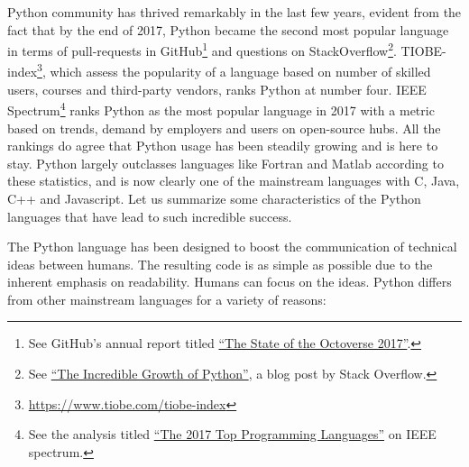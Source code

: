 Python community has thrived remarkably in the last few years, evident from the
fact that by the end of 2017, Python became the second most popular language in
terms of pull-requests in GitHub\footnote{See GitHub's annual report titled
\href{https://octoverse.github.com/}{ ``The State of the Octoverse 2017''}.} and
questions on StackOverflow\footnote{See
\href{https://stackoverflow.blog/2017/09/06/incredible-growth-python/}{ ``The
Incredible Growth of Python''}, a blog post by Stack Overflow.}.
%
TIOBE-index\footnote{\url{https://www.tiobe.com/tiobe-index}}, which assess the
popularity of a language based on number of skilled users, courses and
third-party vendors, ranks Python at number four. IEEE Spectrum\footnote{See
the analysis titled \href{https://spectrum.ieee.org/computing/software/%
the-2017-top-programming-languages}{``The 2017 Top Programming Languages''} on
IEEE spectrum.} ranks Python as the most popular language in 2017 with a metric
based on trends, demand by employers and users on open-source hubs.  All the
rankings do agree that Python usage has been steadily growing and is here to
stay.  Python largely outclasses languages like Fortran and Matlab according to
these statistics, and is now clearly one of the mainstream languages with C,
Java, C++ and Javascript.
%
Let us summarize some characteristics of the Python languages that have lead to
such incredible success.



The Python language has been designed to boost the communication of technical
ideas between humans. The resulting code is as simple as possible due to the
inherent emphasis on readability. Humans can focus on the ideas. Python differs
from other mainstream languages for a variety of reasons:

